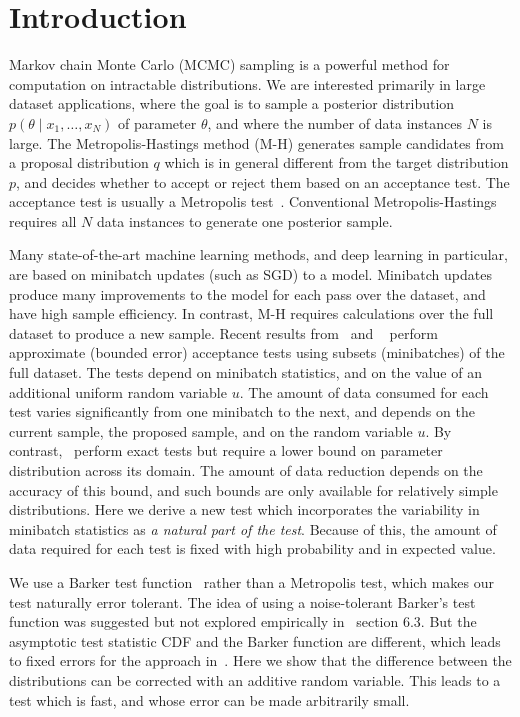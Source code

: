 \documentclass[twoside]{article} \usepackage{aistats2017}
\begin{document}
\section{Introduction}\label{sec:introduction}
Markov chain Monte Carlo (MCMC) sampling is a powerful method for
computation on intractable distributions. We are interested primarily
in large dataset applications, where the goal is to sample a posterior
distribution $p(\theta \mid x_1, \ldots, x_N)$ of parameter $\theta$,
and where the number of data instances $N$ is large.  The
Metropolis-Hastings method (M-H) generates sample candidates from a
proposal distribution $q$ which is in general different from the
target distribution $p$, and decides whether to accept or reject them
based on an acceptance test. The acceptance test is usually a
Metropolis test~\citep{Metropolis1953, hastings70}. Conventional
Metropolis-Hastings requires all $N$ data instances to generate one
posterior sample.

Many state-of-the-art machine learning methods, and deep learning in
particular, are based on minibatch updates (such as SGD) to a model.
Minibatch updates produce many improvements to the model for each pass
over the dataset, and have high sample efficiency. %
In contrast, M-H requires calculations over the full dataset to produce a new sample.  Recent
results from~\citet{cutting_mh_2014} and ~\citet{icml2014c1_bardenet14} perform
approximate (bounded error) acceptance tests using subsets
(minibatches) of the full dataset. The tests depend on minibatch
statistics, and on the value of an additional uniform random variable
$u$. The amount of data consumed for each test varies significantly
from one minibatch to the next, and depends on the current sample, the
proposed sample, and on the random variable $u$. By
contrast,~\citet{conf/uai/MaclaurinA14,TallData15} perform exact
tests but require a lower bound on parameter distribution across its
domain.  The amount of data reduction depends on the accuracy of this
bound, and such bounds are only available for relatively simple
distributions. %
Here we derive a new test which incorporates the variability in minibatch
statistics as {\em a natural part of the test}. Because of this, the amount of
data required for each test is fixed with high probability and in expected
value. 

We use a Barker test function~\citep{Barker65} rather than a Metropolis
test, which makes our test naturally error tolerant. The idea of using
a noise-tolerant %
Barker's test function was suggested but
not explored empirically in~\citet{TallData15} section 6.3. But the
asymptotic test statistic CDF and the Barker function are different,
which leads to fixed errors for the approach
in~\citet{TallData15}. Here we show that the difference between the
distributions can be corrected with an additive random variable. This
leads to a test which is fast, and whose error can be made arbitrarily
small.
\end{document}
